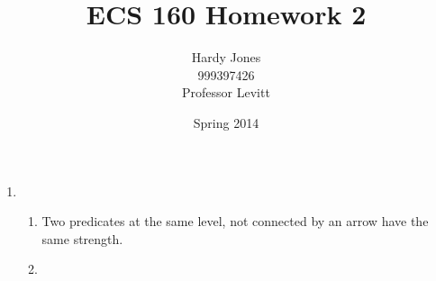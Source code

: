 \documentclass[12pt,letterpaper]{article}
\title{ECS 160 Homework 2 \vspace{-2ex}}
\author{Hardy Jones\\
        999397426\\
        Professor Levitt\vspace{-2ex}}
\date{Spring 2014}
\begin{document}
  \maketitle

  \begin{enumerate}
    \item
      \begin{enumerate}
        \item
          Two predicates at the same level,
          not connected by an arrow have the same strength.
        \item

      \end{enumerate}
  \end{enumerate}
\end{document}
